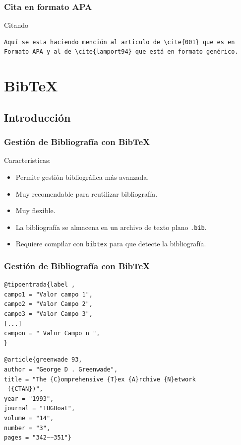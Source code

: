 \documentclass[aspectratio=43]{beamer}%
\begin{document}
\begin{frame}[fragile]
\frametitle{\textbf{Cita en formato APA}}
\justifying
 \begin{exampleblock}{Citando}
   \vspace{-0.8cm}
\begin{lstlisting}
Aquí se esta haciendo mención al articulo de \cite{001} que es en Formato APA y al de \cite{lamport94} que está en formato genérico.
\end{lstlisting}\vspace{-0.3cm}
\end{exampleblock}


\end{frame}


\section{Bib\TeX{}}
\subsection{Introducción}
\begin{frame}[fragile]
\frametitle{\textbf{Gestión de Bibliografía con Bib\TeX{}}}
\justifying
 Caracteristicas:
 \begin{itemize}\justifying
  \item Permite gestión bibliográfica más avanzada.
  \item Muy recomendable para reutilizar bibliografía.
  \item Muy flexible.
  \item La bibliografía se almacena en un archivo de texto plano \texttt{.bib}.
  \item Requiere compilar con \texttt{bibtex} para que detecte la bibliografía.
\end{itemize}

\end{frame}

\begin{frame}[fragile]
\frametitle{\textbf{Gestión de Bibliografía con Bib\TeX{}}}
\justifying
 \begin{block}{}\small
   \vspace{-0.7cm}
\begin{lstlisting}
@tipoentrada{label , 
campo1 = "Valor campo 1", 
campo2 = "Valor Campo 2",
campo3 = "Valor Campo 3",
[...]
campon = " Valor Campo n ",
}
\end{lstlisting}\vspace{-0.3cm}

\end{block}

\begin{exampleblock}{}\small
\begin{verbatim}
@article{greenwade 93,
author = "George D . Greenwade", 
title = "The {C}omprehensive {T}ex {A}rchive {N}etwork
 ({CTAN})", 
year = "1993",
journal = "TUGBoat", 
volume = "14", 
number = "3",
pages = "342−−351"}
\end{verbatim}

\end{exampleblock}


\end{frame}
\end{document}
